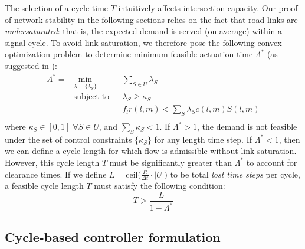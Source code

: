 The selection of a cycle time $T$ intuitively affects intersection capacity. Our proof of network stability in the following sections relies on the fact that road links are \emph{undersaturated}: that is, the expected demand is served (on average) within a signal cycle. To avoid link saturation, we therefore pose the following convex optimization problem to determine minimum feasible actuation time $\Lambda^*$ (as suggested in \cite{MaxPressureStochastic}):
\begin{equation} \label{sum_lambda}
\begin{aligned}
\Lambda ^{*} = & \min_{\lambda = \{\lambda_S\}}
& & \sum_{S\in U} \lambda_{S} \\
& \text{subject to}
& &  \lambda_{S} \geq \kappa_S\\
&&& f_{l}r(l,m) < \sum_{S}\lambda_{S} c(l,m)S(l,m)\\
\end{aligned}
\end{equation}
where $\kappa_S \in [0,1] \; \forall S\in U$, and $\sum_S \kappa_S <1$. If $\Lambda^* > 1$, the demand is not feasible under the set of control constraints $\{\kappa_S\}$ for any length time step. If $\Lambda^* < 1$, then we can define a cycle length for which flow is admissible without link saturation. However, this cycle length $T$ must be significantly greater than $\Lambda^*$ to account for clearance times. If we define $L = \text{ceil}\big(\frac{R}{\Delta t} \cdot |U|\big)$ to be total \emph{lost time steps} per cycle, a feasible cycle length $T$ must satisfy the following condition: 
\begin{equation} T > \frac{L}{1-\Lambda^*} \label{minTime} \end{equation} 




\subsection*{Cycle-based controller formulation}


